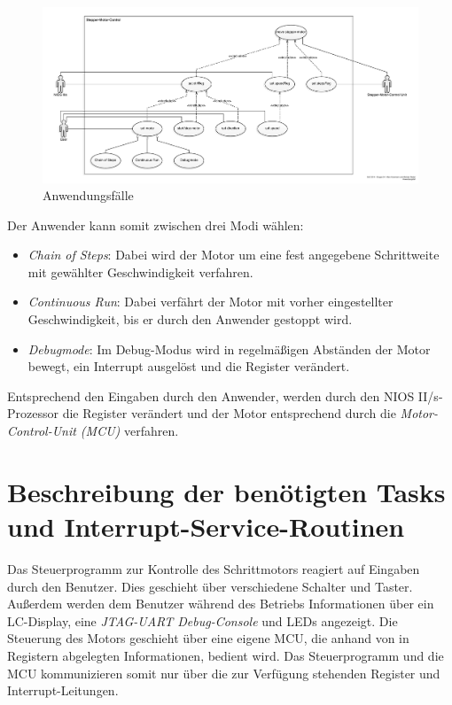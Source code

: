 \documentclass[ngerman,fontsize=12pt , paper=a4 , twoside=false , DIV12 , BCOR=1cm ,
numbers=enddot , listof=totoc , bibliography=totoc , index=totoc ,
headings=small , headlines=1.5 , final]{scrbook}
\begin{document}
\begin{figure}[htbp]
\centering
\includegraphics{../Diagrams/UseCases.pdf}
\caption{Anwendungsfälle\label{fig:anwendungsfaelle}}
\end{figure}

Der Anwender kann somit zwischen drei Modi wählen:

\begin{itemize}
\item
  \emph{Chain of Steps}: Dabei wird der Motor um eine fest angegebene
  Schrittweite mit gewählter Geschwindigkeit verfahren.
\item
  \emph{Continuous Run}: Dabei verfährt der Motor mit vorher
  eingestellter Geschwindigkeit, bis er durch den Anwender gestoppt
  wird.
\item
  \emph{Debugmode}: Im Debug-Modus wird in regelmäßigen Abständen der
  Motor bewegt, ein Interrupt ausgelöst und die Register verändert.
\end{itemize}

Entsprechend den Eingaben durch den Anwender, werden durch den NIOS
II/s-Prozessor die Register verändert und der Motor entsprechend durch
die \emph{Motor-Control-Unit (MCU)} verfahren.

\chapter{Beschreibung der benötigten Tasks und
Interrupt-Service-Routinen}\label{beschreibung-der-benuxf6tigten-tasks-und-interrupt-service-routinen}

Das Steuerprogramm zur Kontrolle des Schrittmotors reagiert auf Eingaben
durch den Benutzer. Dies geschieht über verschiedene Schalter und
Taster. Außerdem werden dem Benutzer während des Betriebs Informationen
über ein LC-Display, eine \emph{JTAG-UART Debug-Console} und LEDs
angezeigt. Die Steuerung des Motors geschieht über eine eigene MCU, die
anhand von in Registern abgelegten Informationen, bedient wird. Das
Steuerprogramm und die MCU kommunizieren somit nur über die zur
Verfügung stehenden Register und Interrupt-Leitungen.
\end{document}
